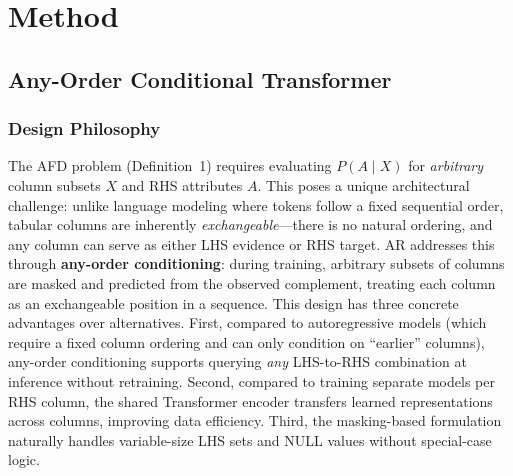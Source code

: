 \documentclass[conference]{IEEEtran}
\begin{document}
\section{Method}\label{sec:method}

\subsection{Any-Order Conditional Transformer}\label{sec:arch}

\subsubsection{Design Philosophy}
The AFD problem (Definition~1) requires evaluating $P(A \mid X)$ for \emph{arbitrary} column subsets $X$ and RHS attributes $A$. This poses a unique architectural challenge: unlike language modeling where tokens follow a fixed sequential order, tabular columns are inherently \emph{exchangeable}---there is no natural ordering, and any column can serve as either LHS evidence or RHS target. AR addresses this through \textbf{any-order conditioning}: during training, arbitrary subsets of columns are masked and predicted from the observed complement, treating each column as an exchangeable position in a sequence. This design has three concrete advantages over alternatives. First, compared to autoregressive models (which require a fixed column ordering and can only condition on ``earlier'' columns), any-order conditioning supports querying \emph{any} LHS-to-RHS combination at inference without retraining. Second, compared to training separate models per RHS column, the shared Transformer encoder transfers learned representations across columns, improving data efficiency. Third, the masking-based formulation naturally handles variable-size LHS sets and NULL values without special-case logic.
\end{document}

